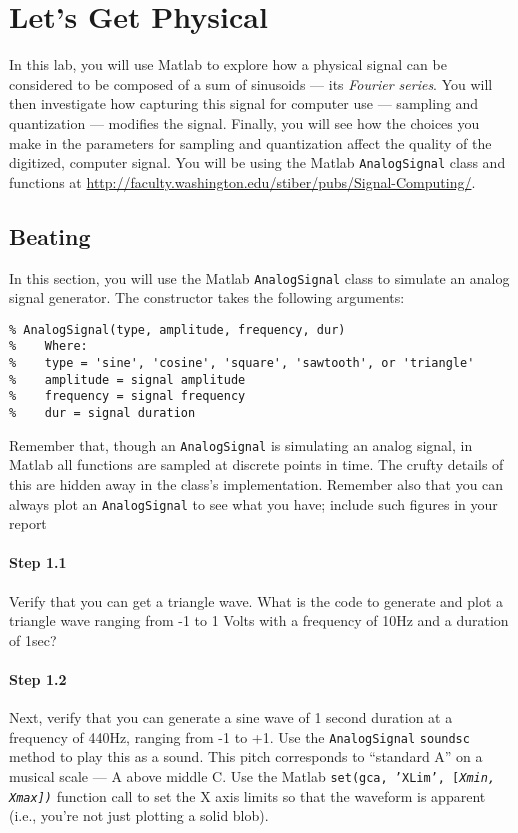 
\section{Let's Get Physical}

In this lab, you will use Matlab to explore how a physical signal can
be considered to be composed of a sum of sinusoids --- its
\emph{Fourier series}. You will then investigate how capturing this
signal for computer use --- sampling and quantization --- modifies the
signal. Finally, you will see how the choices you make in the
parameters for sampling and quantization affect the quality of the
digitized, computer signal. You will be using the Matlab
\texttt{AnalogSignal} class and functions at
\url{http://faculty.washington.edu/stiber/pubs/Signal-Computing/}.

\subsection{Beating}

In this section, you will use the Matlab \texttt{AnalogSignal} class
to simulate an analog signal generator. The constructor takes the
following arguments:
\begin{verbatim}
% AnalogSignal(type, amplitude, frequency, dur)
%    Where:
%    type = 'sine', 'cosine', 'square', 'sawtooth', or 'triangle'
%    amplitude = signal amplitude
%    frequency = signal frequency
%    dur = signal duration
\end{verbatim}

Remember that, though an \texttt{AnalogSignal} is simulating an analog
signal, in Matlab all functions are sampled at discrete points in
time. The crufty details of this are hidden away in the class's
implementation. Remember also that you can always plot an
\texttt{AnalogSignal} to see what you have; include such figures in
your report 

\paragraph{Step 1.1} Verify that you can get a triangle wave. What is
the code to generate and plot a triangle wave ranging from -1 to 1
Volts with a frequency of 10Hz and a duration of 1sec?

\paragraph{Step 1.2} Next, verify that you can generate a sine wave of
1 second duration at a frequency of 440Hz, ranging from -1 to +1. Use
the \texttt{AnalogSignal} \texttt{soundsc} method to play this as a
sound. This pitch corresponds to ``standard A'' on a musical scale ---
A above middle C. Use the Matlab \texttt{set(gca, 'XLim',
  [\itshape{Xmin}, \itshape{Xmax}])} function call to set the X axis
limits so that the waveform is apparent (i.e., you're not just
plotting a solid blob).

